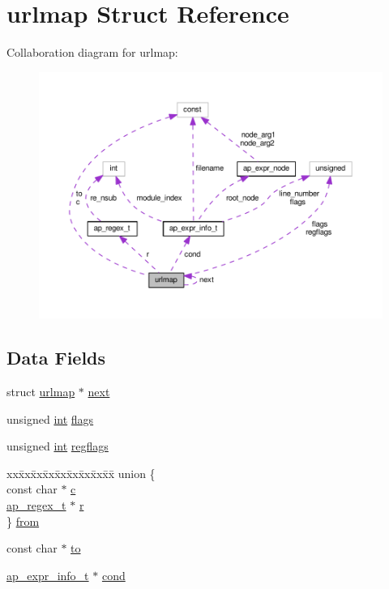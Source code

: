 \hypertarget{structurlmap}{}\section{urlmap Struct Reference}
\label{structurlmap}


Collaboration diagram for urlmap\+:
\nopagebreak
\begin{figure}[H]
\begin{center}
\leavevmode
\includegraphics[width=350pt]{structurlmap__coll__graph}
\end{center}
\end{figure}
\subsection*{Data Fields}
\begin{DoxyCompactItemize}
\item 
struct \hyperlink{structurlmap}{urlmap} $\ast$ \hyperlink{structurlmap_a11718e64937657890d8d1657a7ca56df}{next}
\item 
unsigned \hyperlink{pcre_8txt_a42dfa4ff673c82d8efe7144098fbc198}{int} \hyperlink{structurlmap_aa908596fca7b56ea1cd1c5a51aa71237}{flags}
\item 
unsigned \hyperlink{pcre_8txt_a42dfa4ff673c82d8efe7144098fbc198}{int} \hyperlink{structurlmap_a2fe6577b3bc7b04ad299fe4abd145230}{regflags}
\item 
\begin{tabbing}
xx\=xx\=xx\=xx\=xx\=xx\=xx\=xx\=xx\=\kill
union \{\\
\>const char $\ast$ \hyperlink{structurlmap_a45f7aa94c88336f362f6f8150f810dd3}{c}\\
\>\hyperlink{structap__regex__t}{ap\_regex\_t} $\ast$ \hyperlink{structurlmap_a6bd13a64ef6763e2df1b4dac0d970855}{r}\\
\} \hyperlink{structurlmap_a763b0e88ee0e47c57e1ea12154de9415}{from}\\

\end{tabbing}\item 
const char $\ast$ \hyperlink{structurlmap_a02418042d8574b1906fa9046e74dfc28}{to}
\item 
\hyperlink{structap__expr__info__t}{ap\+\_\+expr\+\_\+info\+\_\+t} $\ast$ \hyperlink{structurlmap_af6d391f2d4936f99a7c15b6d74b85441}{cond}
\end{DoxyCompactItemize}


